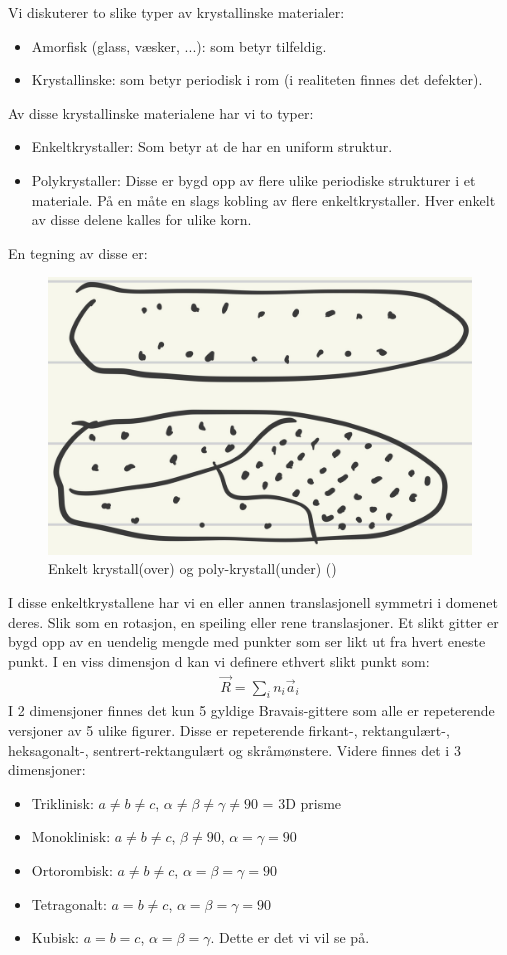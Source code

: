 \documentclass{article}
\begin{document}
Vi diskuterer to slike typer av krystallinske materialer:
\begin{itemize}
    \item Amorfisk (glass, væsker, ...): som betyr tilfeldig.
    \item Krystallinske: som betyr periodisk i rom (i realiteten finnes det defekter).
\end{itemize}
Av disse krystallinske materialene har vi to typer:
\begin{itemize}
    \item Enkeltkrystaller: Som betyr at de har en uniform struktur.
    \item Polykrystaller: Disse er bygd opp av flere ulike periodiske strukturer i et materiale. På en måte en slags kobling av flere enkeltkrystaller. Hver enkelt av disse delene kalles for ulike korn. 
\end{itemize}
En tegning av disse er:
\begin{figure}[H]
    \centering
    \includegraphics[width=0.5\linewidth]{bilder/enkelt_poly_krystaller.png}
    \caption{Enkelt krystall(over) og poly-krystall(under) (\cite{Aleksander})}
    \label{fig:enkelt_poly_krystaller}
\end{figure}
I disse enkeltkrystallene har vi en eller annen translasjonell symmetri i domenet deres. Slik som en rotasjon, en speiling eller rene translasjoner.
Et slikt gitter er bygd opp av en uendelig mengde med punkter som ser likt ut fra hvert eneste punkt. I en viss dimensjon d kan vi definere ethvert slikt punkt som:
\begin{align}
    \vec{R} = \sum_{i} n_i \vec{a}_i
\end{align}
I 2 dimensjoner finnes det kun 5 gyldige Bravais-gittere som alle er repeterende versjoner av 5 ulike figurer. Disse er repeterende firkant-, rektangulært-, heksagonalt-, sentrert-rektangulært og skråmønstere. Videre finnes det i 3 dimensjoner:
\begin{itemize}
    \item Triklinisk: $a\ne b\ne c$, $\alpha \ne \beta \ne \gamma \ne 90$ = 3D prisme
    \item Monoklinisk: $a \ne b \ne c$, $\beta \ne 90$, $\alpha = \gamma = 90$
    \item Ortorombisk: $a \ne b \ne c$, $\alpha = \beta = \gamma = 90$
    \item Tetragonalt: $a = b \ne c$, $\alpha = \beta = \gamma = 90$
    \item Kubisk: $a = b = c$, $\alpha = \beta = \gamma$. Dette er det vi vil se på.
\end{itemize}
\end{document}
